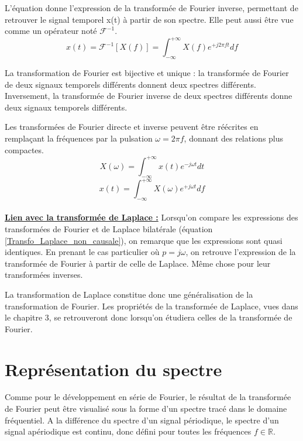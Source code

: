 	L'équation donne l'expression de la transformée de Fourier inverse, permettant de retrouver le signal temporel x(t) à partir de son spectre. Elle peut aussi être vue comme un opérateur noté $\mathcal{F}^{-1}$.
	\begin{equation}\label{Transfo_Fourier_inverse}
	x(t)=\mathcal{F}^{-1}[X(f)]=\int_{-\infty}^{+\infty}X(f)e^{+j2\pi f t}df
	\end{equation}
	
	La transformation de Fourier est bijective et unique : la transformée de Fourier de deux signaux temporels différents donnent deux spectres différents. Inversement, la transformée de Fourier inverse de deux spectres différents donne deux signaux temporels différents. 
	
	Les transformées de Fourier directe et inverse peuvent être réécrites en remplaçant la fréquences par la pulsation $\omega=2\pi f$, donnant des relations plus compactes.
	\begin{equation}\label{Transfo_Fourier_pulsation}
	X(\omega)=\int_{-\infty}^{+\infty}x(t)e^{-j\omega t}dt
	\end{equation}
	\begin{equation}\label{Transfo_Fourier_inverse_pulsation}
	x(t)=\int_{-\infty}^{+\infty}X(\omega)e^{+j\omega t}df
	\end{equation}
	 \\
	
	\underline{\textbf{Lien avec la transformée de Laplace :}}
	Lorsqu'on compare les expressions des transformées de Fourier et de Laplace bilatérale (équation \ref{Transfo_Laplace_non_causale}), on remarque que les expressions sont quasi identiques. En prenant le cas particulier où $p=j\omega$, on retrouve l'expression de la transformée de Fourier à partir de celle de Laplace. Même chose pour leur transformées inverses. 
	
	La transformation de Laplace constitue donc une généralisation de la transformation de Fourier. Les propriétés de la transformée de Laplace, vues dans le chapitre 3, se retrouveront donc lorsqu'on étudiera celles de la transformée de Fourier.\\
	
	
	
	\section{Représentation du spectre}
	
	Comme pour le développement en série de Fourier, le résultat de la transformée de Fourier peut être visualisé sous la forme d'un spectre tracé dans le domaine fréquentiel. A la différence du spectre d'un signal périodique, le spectre d'un signal apériodique est continu, donc défini pour toutes les fréquences $f \in \mathbb{R}$.
	
